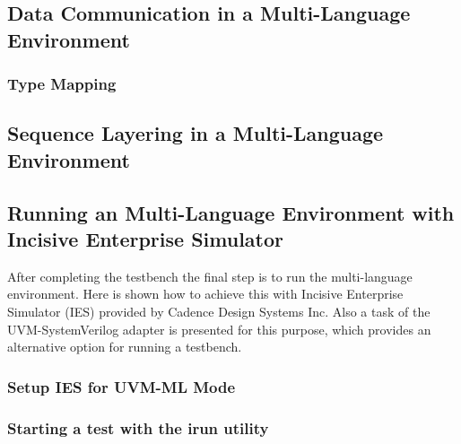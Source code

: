 \lstset{language=SystemVerilog, numbers = left, escapechar=|, breaklines=true}
\begin{lstlisting}[frame=htrbl, caption={SystemVerilog: register an object in configuration database},
label={lst:SV_set_int}]

\end{lstlisting}
\subsection{Data Communication in a Multi-Language Environment} \label{ml_tlm}
\subsubsection{Type Mapping}\label{type_mapping}

\subsection{Sequence Layering in a Multi-Language Environment}

\subsection{Running an Multi-Language Environment with Incisive Enterprise Simulator}

After completing the testbench the final step is to run the multi-language environment. Here is shown how to achieve
this with Incisive Enterprise Simulator (IES) provided by Cadence Design Systems Inc. Also a task of the
UVM-SystemVerilog adapter is presented for this purpose, which provides an alternative option for running a testbench.

\subsubsection{Setup IES for UVM-ML Mode}
\subsubsection{Starting a test with the irun utility} \label{uvm_top}

